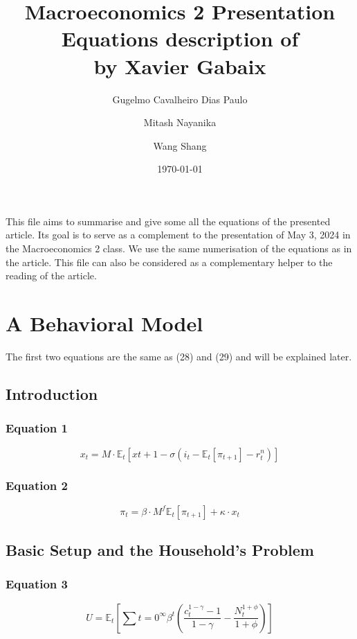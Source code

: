 \documentclass{article}
\title{Macroeconomics 2 Presentation \\ Equations description of \\ \textquote{A Behavioral New Keynesian Model} by Xavier Gabaix}
\author{Gugelmo Cavalheiro Dias Paulo \\ \and Mitash Nayanika \\ \and Wang Shang}
\date{\today}
\begin{document}
\maketitle

This file aims to summarise and give some all the equations of the presented article.
Its goal is to serve as a complement to the presentation of May 3, 2024 in the Macroeconomics 2 class. 
We use the same numerisation of the equations as in the article.
This file can also be considered as a complementary helper to the reading of the article.

\pagebreak
\tableofcontents
\pagebreak

\section{A Behavioral Model}
The first two equations are the same as (28) and (29) and will be explained later.

\subsection{Introduction}

\subsubsection*{Equation 1}
\begin{equation}
    x_{t}=M\cdot\mathbb{E}_{t}\left[ x{t+1} -\sigma (i_{t}-\mathbb{E}_{t}\left[\pi_{t+1}\right]-r^{n}_{t})\right]
\end{equation}

\subsubsection*{Equation 2}
\begin{equation}
    \pi_{t}=\beta\cdot M^{f} \mathbb{E}_{t}\left[\pi_{t+1}\right]+\kappa\cdot x_{t}
\end{equation}

\subsection{Basic Setup and the Household’s Problem}

\subsubsection*{Equation 3}
\begin{equation}
    U = \mathbb{E}_{t} \left[ \sum{t=0}^{\infty} \beta^{t}\left(\frac{c_{t}^{1-\gamma}-1}{1-\gamma} - \frac{N_{t}^{1+\phi}}{1+\phi}\right)\right]
\end{equation}
\end{document}

